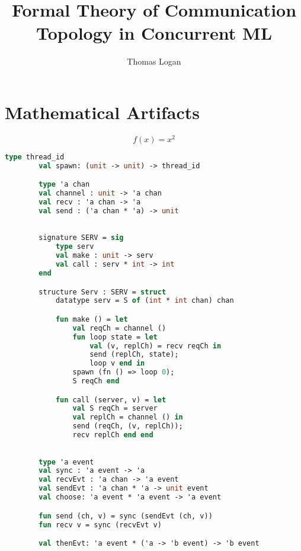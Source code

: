 \documentclass{article}
\title{Formal Theory of Communication Topology in Concurrent ML}
\author{Thomas Logan}
\begin{document}
    \maketitle

    \newpage

    \section{Mathematical Artifacts}

    \begin{equation*}
        f(x) = x^2
        \end{equation*}

    \begin{lstlisting}[language=ML, style=codestyle1]
        type thread_id
        val spawn: (unit -> unit) -> thread_id

        type 'a chan
        val channel : unit -> 'a chan
        val recv : 'a chan -> 'a
        val send : ('a chan * 'a) -> unit
        \end{lstlisting}

    \begin{lstlisting}[language=ML, style=codestyle1]

        signature SERV = sig 
            type serv
            val make : unit -> serv
            val call : serv * int -> int
        end

        structure Serv : SERV = struct 
            datatype serv = S of (int * int chan) chan 

            fun make () = let 
                val reqCh = channel ()
                fun loop state = let
                    val (v, replCh) = recv reqCh in 
                    send (replCh, state);
                    loop v end in
                spawn (fn () => loop 0);
                S reqCh end 

            fun call (server, v) = let 
                val S reqCh = server
                val replCh = channel () in 
                send (reqCh, (v, replCh));
                recv replCh end end

        \end{lstlisting}

    \begin{lstlisting}[language=ML, style=codestyle1]

        type 'a event
        val sync : 'a event -> 'a
        val recvEvt : 'a chan -> 'a event
        val sendEvt : 'a chan * 'a -> unit event
        val choose: 'a event * 'a event -> 'a event

        fun send (ch, v) = sync (sendEvt (ch, v))
        fun recv v = sync (recvEvt v)

        val thenEvt: 'a event * ('a -> 'b event) -> 'b event

        \end{lstlisting}
\end{document}
